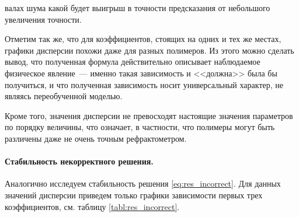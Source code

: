 \documentclass[12pt,a4paper]{article}
\theoremstyle{definition}
\begin{document}
валах шума какой будет выигрыш в точности
предсказания от небольшого увеличения точности.

Отметим так же, что для коэффициентов, стоящих на одних и тех же местах, графики дисперсии
похожи даже для разных полимеров. Из этого можно сделать вывод, что полученная формула
действительно описывает наблюдаемое физическое явление~--- именно такая зависимость и
<<должна>> была бы получиться, и что полученная зависимость носит универсальный характер,
не являясь переобученной моделью.

Кроме того, значения дисперсии не превосходят настоящие значения параметров по порядку величины,
что означает, в частности, что полимеры могут быть различены даже не очень точным рефрактометром.

\paragraph{Стабильность некорректного решения.}

Аналогично исследуем стабильность решения \eqref{eq:res_incorrect}. Для данных значений дисперсии
приведем только графики зависимости первых трех коэффициентов, см. таблицу \ref{tabl:res_incorrect}.
\end{document}
